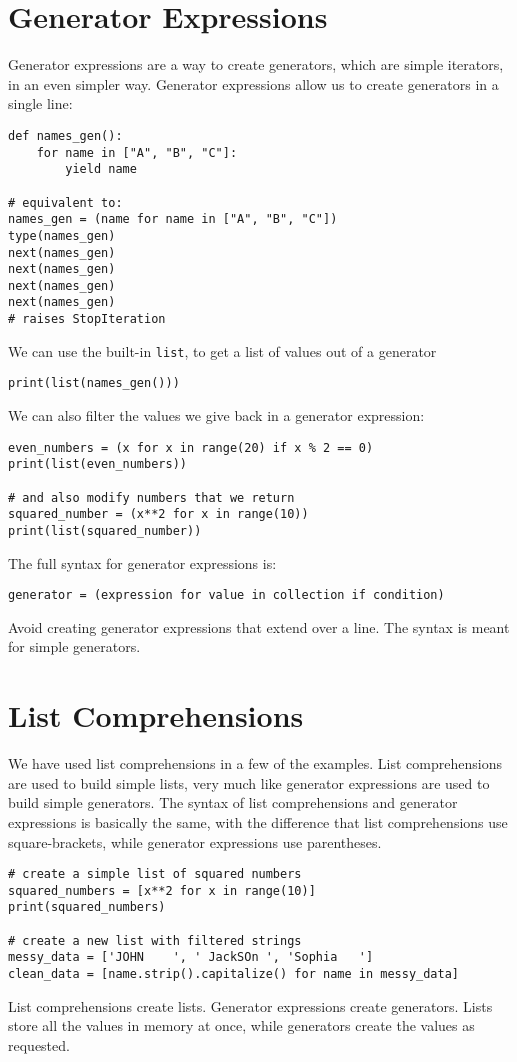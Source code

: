 \documentclass[12pt, a4paper]{article}
\begin{document}
\section{Generator Expressions}
\label{sec:orgd150365}
Generator expressions are a way to create generators, which are simple iterators, in an even simpler way.
Generator expressions allow us to create generators in a single line:
\lstset{language=jupyter-python,label= ,caption= ,captionpos=b,numbers=none}
\begin{lstlisting}
def names_gen():
    for name in ["A", "B", "C"]:
        yield name

# equivalent to:
names_gen = (name for name in ["A", "B", "C"])
type(names_gen)
next(names_gen)
next(names_gen)
next(names_gen)
next(names_gen)
# raises StopIteration
\end{lstlisting}
We can use the built-in \texttt{list}, to get a list of values out of a generator
\lstset{language=jupyter-python,label= ,caption= ,captionpos=b,numbers=none}
\begin{lstlisting}
print(list(names_gen()))
\end{lstlisting}

We can also filter the values we give back in a generator expression:
\lstset{language=jupyter-python,label= ,caption= ,captionpos=b,numbers=none}
\begin{lstlisting}
even_numbers = (x for x in range(20) if x % 2 == 0)
print(list(even_numbers))

# and also modify numbers that we return
squared_number = (x**2 for x in range(10))
print(list(squared_number))
\end{lstlisting}
The full syntax for generator expressions is:
\lstset{language=jupyter-python,label= ,caption= ,captionpos=b,numbers=none}
\begin{lstlisting}
generator = (expression for value in collection if condition)
\end{lstlisting}
Avoid creating generator expressions that extend over a line.
The syntax is meant for simple generators.
\section{List Comprehensions}
\label{sec:org105ad57}
We have used list comprehensions in a few of the examples.
List comprehensions are used to build simple lists, very much like generator expressions are used to build simple generators.
The syntax of list comprehensions and generator expressions is basically the same, with the difference that list comprehensions use square-brackets, while generator expressions use parentheses.
\lstset{language=jupyter-python,label= ,caption= ,captionpos=b,numbers=none}
\begin{lstlisting}
# create a simple list of squared numbers
squared_numbers = [x**2 for x in range(10)]
print(squared_numbers)

# create a new list with filtered strings
messy_data = ['JOHN    ', ' JackSOn ', 'Sophia   ']
clean_data = [name.strip().capitalize() for name in messy_data]
\end{lstlisting}
List comprehensions create lists.
Generator expressions create generators.
Lists store all the values in memory at once, while generators create the values as requested.
\end{document}
